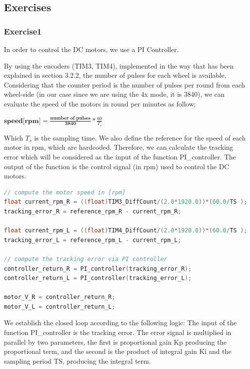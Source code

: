 \documentclass[english]{article}
\begin{document}
\subsection{Exercises}
\subsubsection{Exercise1}
In order to control the DC motors, we use a PI Controller. 

By using the encoders (TIM3, TIM4), implemented in the way that has been explained 
in section 3.2.2, the number of pulses for each wheel is available. Considering 
that the counter period is the number of pulses per round from each wheel-side
 (in our case since we are using the 4x mode, it is 3840), we can evaluate the 
 speed of the motors in round per minutes as follow: \newline
 \begin{center}
    $\textbf{speed[rpm]} = \frac{\textbf{number of pulses}}{\textbf{3840}} * \frac{60}{T_s}$
 \end{center}
 Which $T_s$ is the sampling time. We also define the reference for the 
 speed of each motor in rpm, which are hardcoded. Therefore, we can 
 calculate the tracking error which will be considered as the input of
  the function PI\_controller. The output of the function is the control signal
   (in rpm) used to control the DC motors. 
\begin{lstlisting}[language=C, caption={calculating the control signal for DC motors in rpm }, label={lst:rpm} ]
// compute the motor speed in [rpm]
float current_rpm_R = ((float)TIM3_DiffCount/(2.0*1920.0))*(60.0/TS );
tracking_error_R = reference_rpm_R - current_rpm_R;

float current_rpm_L = ((float)TIM4_DiffCount/(2.0*1920.0))*(60.0/TS );
tracking_error_L = reference_rpm_L - current_rpm_L;

// compute the tracking error via PI controller
controller_return_R = PI_controller(tracking_error_R);
controller_return_L = PI_controller(tracking_error_L);

motor_V_R = controller_return_R;
motor_V_L = controller_return_L; 
\end{lstlisting}
We establish the closed loop according to the following logic: 
The input of the function PI\_controller is the tracking error.
 The error signal is multiplied in parallel by two parameters, the 
 first is proportional gain Kp producing the proportional term, and
  the second is the product of integral gain Ki and the sampling period 
  TS, producing the integral term.  
\end{document}
